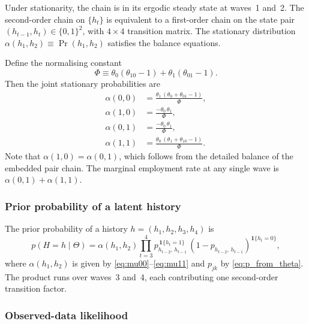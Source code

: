 Under stationarity, the chain is in its ergodic steady state at waves~1
and~2. The second-order chain on $\{h_t\}$ is equivalent to a
first-order chain on the state pair $(h_{t-1}, h_t) \in \{0,1\}^2$,
with $4 \times 4$ transition matrix. The stationary distribution
$\alpha(h_1, h_2) \equiv \Pr(h_1, h_2)$ satisfies the balance equations.

Define the normalising constant
\begin{equation}
\Phi \equiv \theta_0(\theta_{10} - 1) + \theta_1(\theta_{01} - 1).
\label{eq:Phi}
\end{equation}
Then the joint stationary probabilities are
\begin{align}
\alpha(0, 0) &= \frac{\theta_1\,(\theta_0 + \theta_{01} - 1)}{\Phi},
\label{eq:mu00} \\[4pt]
\alpha(1, 0) &= \frac{-\theta_0\,\theta_1}{\Phi},
\label{eq:mu10} \\[4pt]
\alpha(0, 1) &= \frac{-\theta_0\,\theta_1}{\Phi},
\label{eq:mu01} \\[4pt]
\alpha(1, 1) &= \frac{\theta_0\,(\theta_1 + \theta_{10} - 1)}{\Phi}.
\label{eq:mu11}
\end{align}
Note that $\alpha(1,0) = \alpha(0,1)$, which follows from the detailed
balance of the embedded pair chain. The marginal employment rate at
any single wave is $\alpha(0,1) + \alpha(1,1)$.

\subsubsection{Prior probability of a latent history}

The prior probability of a history $h = (h_1, h_2, h_3, h_4)$ is
\begin{equation}
p(H = h \mid \Theta) =
\alpha(h_1, h_2)
\prod_{t=3}^{4}
p_{h_{t-2},\, h_{t-1}}^{\,\mathbf{1}\{h_t = 1\}}\,
(1 - p_{h_{t-2},\, h_{t-1}})^{\mathbf{1}\{h_t = 0\}},
\label{eq:ar2_prior}
\end{equation}
where $\alpha(h_1, h_2)$ is given by
\eqref{eq:mu00}--\eqref{eq:mu11} and $p_{jk}$ by
\eqref{eq:p_from_theta}. The product runs over waves~3 and~4, each
contributing one second-order transition factor.

\subsubsection{Observed-data likelihood}

